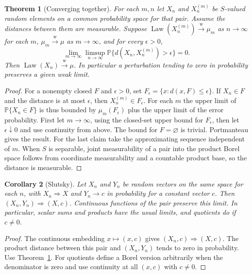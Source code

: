 \documentclass[11pt,oneside,openany]{book}
\newcommand{\Prob}{\mathbb{P}}
\DeclareMathOperator{\Law}{Law}
\newcommand{\weakto}{\xrightarrow{\mathrm{w}}}
\theoremstyle{plain}
\newtheorem{theorem}{Theorem}[chapter]
\newtheorem{corollary}[theorem]{Corollary}
\theoremstyle{definition}
\theoremstyle{remark}
\begin{document}
\begin{theorem}[Converging together]
\label{thm:p06-together}
For each \(m,n\) let \(X_n\) and \(X_n^{(m)}\) be \(S\)-valued random
elements on a common probability space for that pair. Assume the
distances between them are measurable. Suppose
\(\Law(X_n^{(m)})\weakto\mu_m\) as \(n\to\infty\) for each \(m\),
\(\mu_m\weakto\mu\) as \(m\to\infty\), and for every \(\epsilon>0\),
\[
 \lim_{m\to\infty}\limsup_{n\to\infty}
      \Prob\{d(X_n,X_n^{(m)})>\epsilon\}=0.
\]
Then \(\Law(X_n)\weakto\mu\). In particular a perturbation tending
to zero in probability preserves a given weak limit.
\end{theorem}

\begin{proof}
For a nonempty closed \(F\) and \(\epsilon>0\), set
\(F_\epsilon=\{x:d(x,F)\leq\epsilon\}\). If \(X_n\in F\) and the
distance is at most \(\epsilon\), then \(X_n^{(m)}\in F_\epsilon\).
For each \(m\) the upper limit of \(\Prob\{X_n\in F\}\) is thus bounded
by \(\mu_m(F_\epsilon)\) plus the upper limit of the error probability.
First let \(m\to\infty\), using the closed-set upper bound for
\(F_\epsilon\), then let \(\epsilon\downarrow0\) and use continuity from
above. The bound for \(F=\varnothing\) is trivial. Portmanteau gives the
result. For the last claim take the approximating sequence independent
of \(m\). When \(S\) is separable, joint measurability of a pair into
the product Borel space follows from coordinate measurability and a
countable product base, so the distance is measurable.
\end{proof}

\begin{corollary}[Slutsky]
\label{cor:p06-slutsky}
Let \(X_n\) and \(Y_n\) be random vectors on the same space for each
\(n\), with \(X_n\Rightarrow X\) and \(Y_n\to c\) in probability for a
constant vector \(c\). Then \((X_n,Y_n)\Rightarrow(X,c)\).
Continuous functions of the pair preserve this limit. In particular,
scalar sums and products have the usual limits, and quotients do if
\(c\neq0\).
\end{corollary}

\begin{proof}
The continuous embedding \(x\mapsto(x,c)\) gives
\((X_n,c)\Rightarrow(X,c)\). The product distance between this pair and
\((X_n,Y_n)\) tends to zero in probability. Use
Theorem~\ref{thm:p06-together}. For quotients define a Borel version
arbitrarily when the denominator is zero and use continuity at all
\((x,c)\) with \(c\ne0\).
\end{proof}
\end{document}
